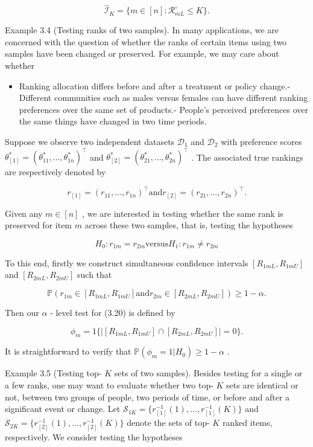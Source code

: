 \[
\widehat{\mathcal{I}}_K = \{m\in [n]:\mathcal{R}_{mL}^{\circ}\leq K\} .
\]

Example 3.4 (Testing ranks of two samples). In many applications, we are
concerned with the question of whether the ranks of certain items using
two samples have been changed or preserved. For example, we may care
about whether

\begin{itemize}
\tightlist
\item
  Ranking allocation differs before and after a treatment or policy
  change.- Different communities such as males versus females can have
  different ranking preferences over the same set of products.- People's
  perceived preferences over the same things have changed in two time
  periods.
\end{itemize}

Suppose we observe two independent datasets \(\mathcal{D}_1\) and
\(\mathcal{D}_2\) with preference scores
\(\theta_{[1]}^{*} = (\theta_{11}^{*},\ldots ,\theta_{1n}^{*})^{\top}\)
and
\(\theta_{[2]}^{*} = (\theta_{21}^{*},\ldots ,\theta_{2n}^{*})^{\top}\)
. The associated true rankings are respectively denoted by

\[
r_{[1]} = (r_{11},\ldots ,r_{1n})^{\top} \text{and} r_{[2]} = (r_{21},\ldots ,r_{2n})^{\top}.
\]

Given any \(m\in [n]\) , we are interested in testing whether the same
rank is preserved for item \(m\) across these two samples, that is,
testing the hypotheses

\[
H_{0}:r_{1m} = r_{2m} \text{versus} H_{1}:r_{1m}\neq r_{2m} \tag{3.20}
\]

To this end, firstly we construct simultaneous confidence intervals
\([R_{1mL},R_{1mU}]\) and \([R_{2mL},R_{2mU}]\) such that

\[
\mathbb{P}(r_{1m}\in [R_{1mL},R_{1mU}]\text{and} r_{2m}\in [R_{2mL},R_{2mU}])\geq 1 - \alpha . \tag{3.21}
\]

Then our \(\alpha\) - level test for (3.20) is defined by

\[
\phi_{m} = 1\{|[R_{1mL},R_{1mU}]\cap [R_{2mL},R_{2mU}]| = 0\} .
\]

It is straightforward to verify that
\(\mathbb{P}(\phi_{m} = 1|H_{0})\geq 1 - \alpha\) .

Example 3.5 (Testing top- \(K\) sets of two samples). Besides testing
for a single or a few ranks, one may want to evaluate whether two top-
\(K\) sets are identical or not, between two groups of people, two
periods of time, or before and after a significant event or change. Let
\(\mathcal{S}_{1K} = \{r_{[1]}^{- 1}(1),\ldots ,r_{[1]}^{- 1}(K)\}\) and
\(\mathcal{S}_{2K} = \{r_{[2]}^{- 1}(1),\ldots ,r_{[2]}^{- 1}(K)\}\)
denote the sets of top- \(K\) ranked items, respectively. We consider
testing the hypotheses

